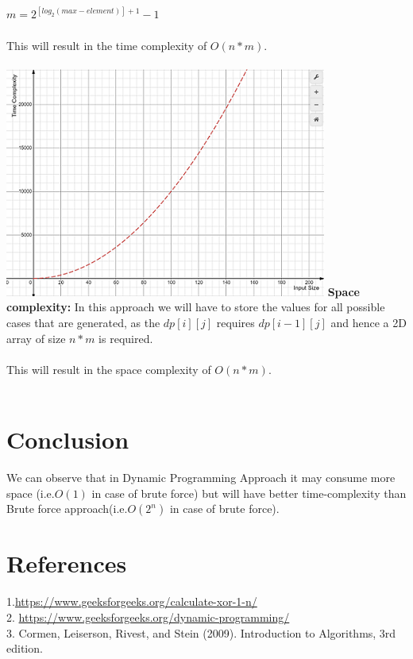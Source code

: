 \documentclass[conference]{IEEEtran}
\begin{document}
\quad $m=2^{[log_2(max-element)] + 1}-1$\\\\
This will result in the time complexity of \textbf{$O(n*m)$}. 
\\\\
\includegraphics{time_comp}
\textbf{Space complexity:}
In this  approach we will have to store the values for all possible cases that are generated, as the $dp[i][j]$ requires $dp[i-1][j]$ and hence a 2D array of size $n*m$ is required.\\\\
This will result in the space complexity of $O(n*m)$. \\\\


\section{Conclusion}
We can observe that in Dynamic Programming Approach it may consume more space (i.e.$O(1)$ in case of brute force) but will have better time-complexity than Brute force approach(i.e.$O(2^n)$ in case of brute force).

 \section{References}
\color{blue}1.{\url{https://www.geeksforgeeks.org/calculate-xor-1-n/} }\\
2. {\url{https://www.geeksforgeeks.org/dynamic-programming/}}\\
3. Cormen, Leiserson, Rivest, and Stein (2009). Introduction to Algorithms, 3rd edition.
\end{document}
